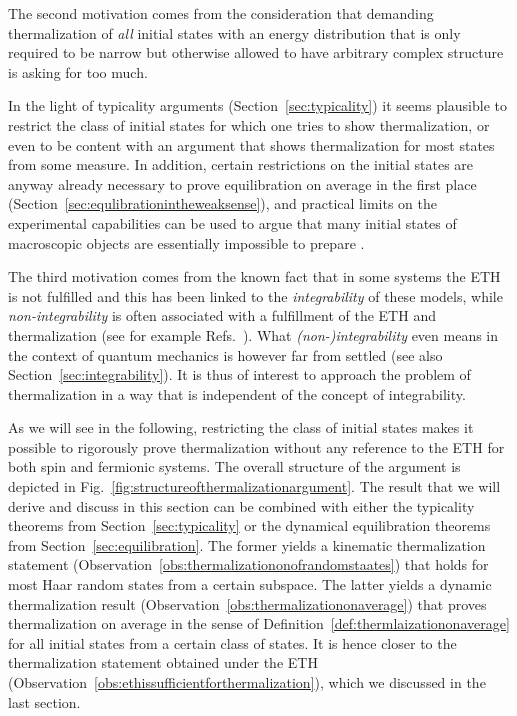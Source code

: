 \documentclass[a4paper,12pt,listof=totoc,index=totoc,bibliography=totoc,headsepline=false,headings=normal,BCOR16.153846mm,DIV12,headinclude,twoside,cleardoublepage=empty,numbers=noenddot,final]{scrreprt}
\theoremstyle{mystyle}
\numberwithin{equation}{section}
\numberwithin{figure}{section}
\numberwithin{lemma}{section}
\numberwithin{theorem}{section}
\numberwithin{corollary}{section}
\numberwithin{definition}{section}
\numberwithin{conjecture}{section}
\numberwithin{observation}{section}
\newcommand{\+}{\mkern2mu}
\DeclareMathOperator{\1}{\mathds{1}}
\begin{document}
The second motivation comes from the consideration that demanding thermalization of \emph{all} initial states with an energy distribution that is only required to be narrow but otherwise allowed to have arbitrary complex structure is asking for too much.

In the light of typicality arguments (Section~\ref{sec:typicality}) it seems plausible to restrict the class of initial states for which one tries to show thermalization, or even to be content with an argument that shows thermalization for most states from some measure.
In addition, certain restrictions on the initial states are anyway already necessary to prove equilibration on average in the first place (Section~\ref{sec:equlibrationintheweaksense}), and practical limits on the experimental capabilities can be used to argue that many initial states of macroscopic objects are essentially impossible to prepare \cite{Reimann12,Reimann2012,Reimann08}.

The third motivation comes from the known fact that in some systems the ETH is not fulfilled and this has been linked to the \emph{integrability} of these models, while \emph{non-integrability} is often associated with a fulfillment of the ETH and thermalization (see for example Refs.~\cite{Rigol07,Rigol08,Rigol11,Larson13,Polkovnikov10,Cassidy11,Gritsev10,Fioretto2010,1006.1634v1,Cazalilla11,1103.0787v1}).
What \emph{\mbox{(non-)}integrability} even means in the context of quantum mechanics is however far from settled \cite{1012.3587v1,Benet2003} (see also Section~\ref{sec:integrability}).
It is thus of interest to approach the problem of thermalization in a way that is independent of the concept of integrability.

As we will see in the following, restricting the class of initial states makes it possible to rigorously prove thermalization without any reference to the ETH for both spin and fermionic systems.
The overall structure of the argument is depicted in Fig.~\ref{fig:structureofthermalizationargument}.
The result that we will derive and discuss in this section can be combined with either the typicality theorems from Section~\ref{sec:typicality} or the dynamical equilibration theorems from Section~\ref{sec:equilibration}.
The former yields a kinematic thermalization statement (Observation~\ref{obs:thermalizationonofrandomstaates}) that holds for most Haar random states from a certain subspace. 
The latter yields a dynamic thermalization result (Observation~\ref{obs:thermalizationonaverage}) that proves thermalization on average in the sense of Definition~\ref{def:thermlaizationonaverage} for all initial states from a certain class of states.
It is hence closer to the thermalization statement obtained under the ETH (Observation~\ref{obs:ethissufficientforthermalization}), which we discussed in the last section.
\end{document}
